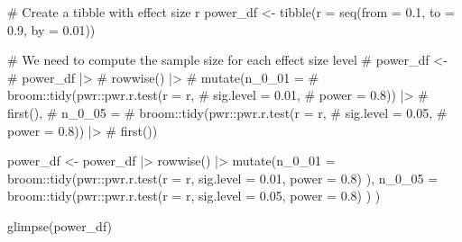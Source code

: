 \documentclass[
  letterpaper,
]{krantz}
\makeatletter
\newenvironment{Shaded}{\begin{snugshade}}{\end{snugshade}}
\newcommand{\AttributeTok}[1]{\textcolor[rgb]{0.40,0.45,0.13}{#1}}
\newcommand{\CommentTok}[1]{\textcolor[rgb]{0.37,0.37,0.37}{#1}}
\newcommand{\FloatTok}[1]{\textcolor[rgb]{0.68,0.00,0.00}{#1}}
\newcommand{\FunctionTok}[1]{\textcolor[rgb]{0.28,0.35,0.67}{#1}}
\newcommand{\NormalTok}[1]{\textcolor[rgb]{0.00,0.23,0.31}{#1}}
\newcommand{\OtherTok}[1]{\textcolor[rgb]{0.00,0.23,0.31}{#1}}
\newcommand{\SpecialCharTok}[1]{\textcolor[rgb]{0.37,0.37,0.37}{#1}}
\newenvironment{kframe}{%
\medskip{}
\setlength{\fboxsep}{.8em}
 \def\at@end@of@kframe{}%
 \ifinner\ifhmode%
  \def\at@end@of@kframe{\end{minipage}}%
  \begin{minipage}{\columnwidth}%
 \fi\fi%
 \def\FrameCommand##1{\hskip\@totalleftmargin \hskip-\fboxsep
 \colorbox{shadecolor}{##1}\hskip-\fboxsep
     \hskip-\linewidth \hskip-\@totalleftmargin \hskip\columnwidth}%
 \MakeFramed {\advance\hsize-\width
   \@totalleftmargin\z@ \linewidth\hsize
   \@setminipage}}%
 {\par\unskip\endMakeFramed%
 \at@end@of@kframe}
\renewenvironment{Shaded}{\begin{kframe}}{\end{kframe}}
\makeatother
\begin{document}
\begin{Shaded}
\begin{Highlighting}[]
\CommentTok{\# Create a tibble with effect size r}
\NormalTok{power\_df }\OtherTok{\textless{}{-}} \FunctionTok{tibble}\NormalTok{(}\AttributeTok{r =} \FunctionTok{seq}\NormalTok{(}\AttributeTok{from =} \FloatTok{0.1}\NormalTok{,}
                           \AttributeTok{to =}  \FloatTok{0.9}\NormalTok{,}
                           \AttributeTok{by =} \FloatTok{0.01}\NormalTok{))}

\CommentTok{\# We need to compute the sample size for each effect size level}
\CommentTok{\# power\_df \textless{}{-}}
\CommentTok{\#   power\_df |\textgreater{}}
\CommentTok{\#   rowwise() |\textgreater{}}
\CommentTok{\#   mutate(n\_0\_01 =}
\CommentTok{\#            broom::tidy(pwr::pwr.r.test(r = r,}
\CommentTok{\#                                        sig.level = 0.01,}
\CommentTok{\#                                        power = 0.8)) |\textgreater{}}
\CommentTok{\#            first(),}
\CommentTok{\#          n\_0\_05 =}
\CommentTok{\#            broom::tidy(pwr::pwr.r.test(r = r,}
\CommentTok{\#                                        sig.level = 0.05,}
\CommentTok{\#                                        power = 0.8)) |\textgreater{}}
\CommentTok{\#            first())}

\NormalTok{power\_df }\OtherTok{\textless{}{-}} 
\NormalTok{  power\_df }\SpecialCharTok{|\textgreater{}}
  \FunctionTok{rowwise}\NormalTok{() }\SpecialCharTok{|\textgreater{}}
  \FunctionTok{mutate}\NormalTok{(}\AttributeTok{n\_0\_01 =}
\NormalTok{           broom}\SpecialCharTok{::}\FunctionTok{tidy}\NormalTok{(pwr}\SpecialCharTok{::}\FunctionTok{pwr.r.test}\NormalTok{(}\AttributeTok{r =}\NormalTok{ r,}
                            \AttributeTok{sig.level =} \FloatTok{0.01}\NormalTok{,}
                            \AttributeTok{power =} \FloatTok{0.8}\NormalTok{)}
\NormalTok{           ),}
         \AttributeTok{n\_0\_05 =}
\NormalTok{           broom}\SpecialCharTok{::}\FunctionTok{tidy}\NormalTok{(pwr}\SpecialCharTok{::}\FunctionTok{pwr.r.test}\NormalTok{(}\AttributeTok{r =}\NormalTok{ r,}
                            \AttributeTok{sig.level =} \FloatTok{0.05}\NormalTok{,}
                            \AttributeTok{power =} \FloatTok{0.8}\NormalTok{)}
\NormalTok{           )}
\NormalTok{         )}

\FunctionTok{glimpse}\NormalTok{(power\_df)}
\end{Highlighting}
\end{Shaded}
\end{document}
